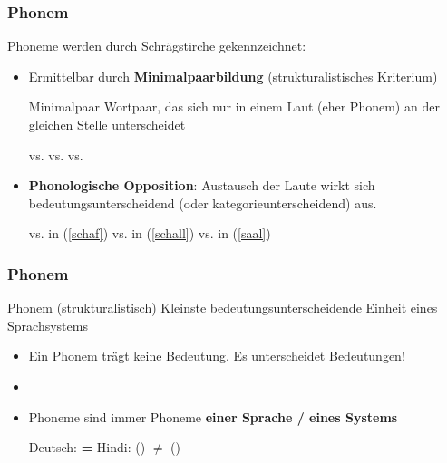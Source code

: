 \begin{frame}
\frametitle{Phonem}

Phoneme werden durch Schrägstirche gekennzeichnet: \textipa{/ /}
	
	\begin{itemize}
		\item Ermittelbar durch \textbf{Minimalpaarbildung} (strukturalistisches Kriterium)
		
		\begin{block}{Minimalpaar}
Wortpaar, das sich nur in einem Laut (eher Phonem) an der gleichen Stelle unterscheidet
		\end{block}
	
	\eal
		\ex \label{schaf} \textipa{[Sa:l]}   vs. \textipa{[Sa:f]} 
		\ex\label{schall} \textipa{[Sa:l]}  vs. \textipa{[Sal]} 
		\ex \label{saal} \textipa{[Sa:l]}  vs. \textipa{[za:l]} 
	\zl
	
		\item \textbf{Phonologische Opposition}: Austausch der Laute wirkt sich bedeutungsunterscheidend (oder kategorieunterscheidend) aus.
	
	\eal
		\ex {} vs.  in (\ref{schaf})
		\ex {} vs.  in (\ref{schall})
		\ex {} vs.  in (\ref{saal})
	\zl			
	
	\end{itemize}

\end{frame}


\begin{frame}
\frametitle{Phonem}

\begin{block}{Phonem (strukturalistisch)}
Kleinste bedeutungsunterscheidende Einheit eines Sprachsystems
\end{block}

\begin{itemize}
	\item Ein Phonem trägt keine Bedeutung. Es unterscheidet Bedeutungen!
	\item[]
	\item Phoneme sind immer Phoneme \textbf{einer Sprache / eines Systems}

	\eal
		\ex Deutsch: \textipa{[papa]} \textbf{=} 
		\ex Hindi: \textipa{[pal]} () \textbf{$\neq$} \textipa{[p\super{h}al]} ()
	\zl

\end{itemize}

\end{frame}


